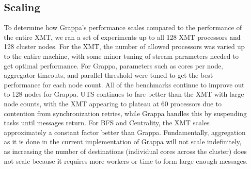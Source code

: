 
\subsection{Scaling}
%
%
To determine how Grappa's performance scales compared to the performance of the entire XMT, we ran a set of experiments up to all 128 XMT processors and 128 cluster nodes. For the XMT, the number of allowed processors was varied up to the entire machine, with some minor tuning of stream parameters needed to get optimal performance. For Grappa, parameters such as cores per node, aggregator timeouts, and parallel threshold were tuned to get the best performance for each node count. All of the benchmarks continue to improve out to 128 nodes for Grappa. UTS continues to fare better than the XMT with large node counts, with the XMT appearing to plateau at 60 processors due to contention from synchronization retries, while Grappa handles this by suspending tasks until messages return. For BFS and Centrality, the XMT scales approximately a constant factor better than Grappa. Fundamentally, aggregation as it is done in the current implementation of Grappa will not scale indefinitely, as increasing the number of destinations (individual cores across the cluster) does not scale because it requires more workers or time to form large enough messages.
